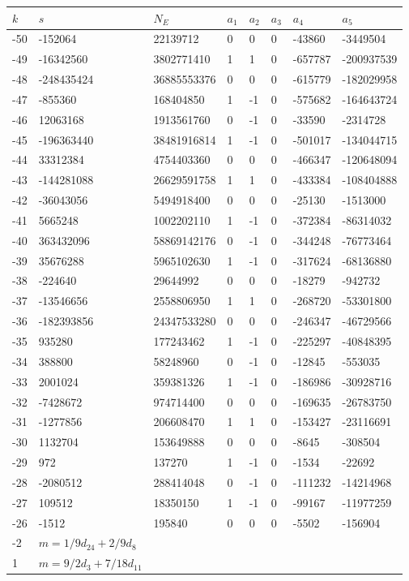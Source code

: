 \documentclass{amsart}
\begin{document}
\begin{longtable}{|l|l|l|lllll|}
\hline
$k$ & $s$ & $N_E$ & $a_1$ & $a_2$ & $a_3$ & $a_4$ & $a_5$\\
\hline
-50&-152064&22139712&0&0&0&-43860&-3449504\\
-49&-16342560&3802771410&1&1&0&-657787&-200937539\\
-48&-248435424&36885553376&0&0&0&-615779&-182029958\\
-47&-855360&168404850&1&-1&0&-575682&-164643724\\
-46&12063168&1913561760&0&-1&0&-33590&-2314728\\
-45&-196363440&38481916814&1&-1&0&-501017&-134044715\\
-44&33312384&4754403360&0&0&0&-466347&-120648094\\
-43&-144281088&26629591758&1&1&0&-433384&-108404888\\
-42&-36043056&5494918400&0&0&0&-25130&-1513000\\
-41&5665248&1002202110&1&-1&0&-372384&-86314032\\
-40&363432096&58869142176&0&-1&0&-344248&-76773464\\
-39&35676288&5965102630&1&-1&0&-317624&-68136880\\
-38&-224640&29644992&0&0&0&-18279&-942732\\
-37&-13546656&2558806950&1&1&0&-268720&-53301800\\
-36&-182393856&24347533280&0&0&0&-246347&-46729566\\
-35&935280&177243462&1&-1&0&-225297&-40848395\\
-34&388800&58248960&0&-1&0&-12845&-553035\\
-33&2001024&359381326&1&-1&0&-186986&-30928716\\
-32&-7428672&974714400&0&0&0&-169635&-26783750\\
-31&-1277856&206608470&1&1&0&-153427&-23116691\\
-30&1132704&153649888&0&0&0&-8645&-308504\\
-29&972&137270&1&-1&0&-1534&-22692\\
-28&-2080512&288414048&0&-1&0&-111232&-14214968\\
-27&109512&18350150&1&-1&0&-99167&-11977259\\
-26&-1512&195840&0&0&0&-5502&-156904\\
-2&$m=1/9d_{24}+2/9d_{8}$&&\multicolumn{5}{c|}{}\\
1&$m=9/2d_{3}+7/18d_{11}$&&\multicolumn{5}{c|}{}\\
\hline
\end{longtable}
\end{document}
